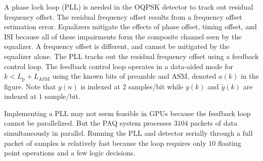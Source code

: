 A phase lock loop (PLL) is needed in the OQPSK detector to track out residual frequency offset.
The residual frequency offset results from a frequency offset estimation error.
Equalizers mitigate the effects of phase offset, timing offset, and ISI because all of these impairments form the  composite channel seen by the equalizer.
A frequency offset is different, and cannot be mitigated by the equalizer alone.
The PLL tracks out the residual frequency offset using a feedback control loop.
The feedback control loop operates in a data-aided mode for $k<L_\text{p}+L_\text{ASM}$ using the known bits of preamble and ASM, denoted $a(k)$ in the figure.
Note that $y(n)$ is indexed at $2$ samples/bit while $y(k)$ and $\tilde{y}(k)$ are indexed at $1$ sample/bit.

Implementing a PLL may not seem feasible in GPUs because the feedback loop cannot be parallelized.
But the PAQ system processes $3104$ packets of data simultaneously in parallel.
Running the PLL and detector serially through a full packet of samples is relatively fast because the loop requires only $10$ floating point operations and a few logic decisions.